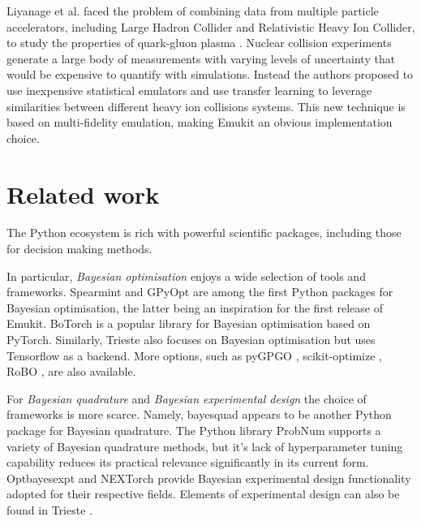 Liyanage et al. faced the problem of combining data from multiple particle accelerators, including Large Hadron Collider and Relativistic Heavy Ion Collider, to study the properties of quark-gluon plasma \cite{PhysRevC105034910}. Nuclear collision experiments generate a large body of measurements with varying levels of uncertainty that would be expensive to quantify with simulations. Instead the authors proposed to use inexpensive statistical emulators and use transfer learning to leverage similarities between different heavy ion collisions systems. This new technique is based on multi-fidelity emulation, making Emukit an obvious implementation choice.

\section{Related work}
The Python ecosystem is rich with powerful scientific packages, including those for decision making methods.

In particular, \emph{Bayesian optimisation} enjoys a wide selection of tools and frameworks. Spearmint \cite{snoek2012practical} and GPyOpt \cite{gpyopt2016} are among the first Python packages for Bayesian optimisation, the latter being an inspiration for the first release of Emukit. BoTorch \cite{balandat2020botorch} is a popular library for Bayesian optimisation based on PyTorch. Similarly, Trieste \cite{picheny2023trieste} also focuses on Bayesian optimisation but uses Tensorflow as a backend. More options, such as pyGPGO \cite{jimenez2017pygpgo}, scikit-optimize \cite{louppe2017bayesian}, RoBO \cite{klein-bayesopt17}, are also available.

For \emph{Bayesian quadrature} and \emph{Bayesian experimental design} the choice of frameworks is more scarce. Namely, bayesquad \cite{Charles2013}   appears to be another Python package for Bayesian quadrature. The Python library ProbNum \cite{Wenger21} supports a variety of Bayesian quadrature methods, but it's lack of hyperparameter tuning capability reduces its practical relevance significantly in its current form. Optbayesexpt \cite{mcmichael2021optbayesexpt} and NEXTorch \cite{wang2021nextorch} provide Bayesian experimental design functionality adopted for their respective fields. Elements of experimental design can also be found in Trieste \cite{picheny2023trieste}.

